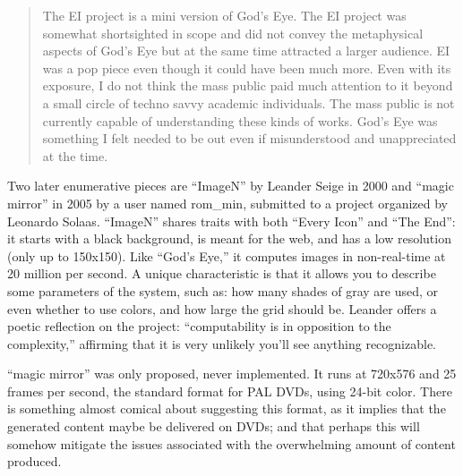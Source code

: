 \documentclass{thesis}
\begin{document}
	\begin{quote}
	The EI project is a mini version of God's Eye. The EI project was somewhat shortsighted in scope and did not convey the metaphysical aspects of God's Eye but at the same time attracted a larger audience. EI was a pop piece even though it could have been much more. Even with its exposure, I do not think the mass public paid much attention to it beyond a small circle of techno savvy academic individuals. The mass public is not currently capable of understanding these kinds of works. God's Eye was something I felt needed to be out even if misunderstood and unappreciated at the time.
	\end{quote}
	
	Two later enumerative pieces are ``ImageN'' by Leander Seige in 2000\cite{leander_seige_imagen_????} and ``magic mirror'' in 2005 by a user named rom\_min\cite{leonardo_solaas_magic_????}, submitted to a project organized by Leonardo Solaas. ``ImageN'' shares traits with both ``Every Icon'' and ``The End'': it starts with a black background, is meant for the web, and has a low resolution (only up to 150x150). Like ``God's Eye,'' it computes images in non-real-time at 20 million per second. A unique characteristic is that it allows you to describe some parameters of the system, such as: how many shades of gray are used, or even whether to use colors, and how large the grid should be. Leander offers a poetic reflection on the project: ``computability is in opposition to the complexity,'' affirming that it is very unlikely you'll see anything recognizable.
	
	``magic mirror'' was only proposed, never implemented. It runs at 720x576 and 25 frames per second, the standard format for PAL DVDs, using 24-bit color. There is something almost comical about suggesting this format, as it implies that the generated content maybe be delivered on DVDs; and that perhaps this will somehow mitigate the issues associated with the overwhelming amount of content produced.
	
\end{document}
